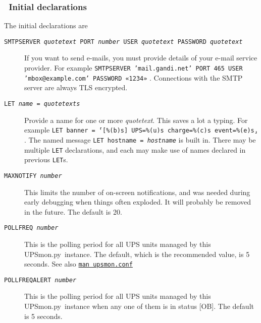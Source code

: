 \documentclass[12pt]{article}
\newlength{\headersep}\setlength{\headersep}{3mm}
\newcommand{\Hsep}{\hspace{\headersep}}
\newcommand{\UPSmon}{\mbox{\textcolor{UPSMONCOLOUR}{UPSmon.py}}}
\newcommand{\status}[1]{\textcolor{UPSDCOLOUR}{[{#1}]}}
\newcommand{\NUTman}[1]{\href{https://networkupstools.org/docs/man/#1.html}{\texttt{man #1}}}
\begin{document}
\subsubsection{\Hsep\ Initial declarations}\label{section:initdecl}

The initial declarations are 

\begin{description}

\item[\texttt{SMTPSERVER \textit{quotetext} PORT \textit{number} USER
    \textit{quotetext} PASSWORD \textit{quotetext}}] \hspace{7mm} If you want
  to send e-mails, you must provide details of your e-mail service provider.
  For example \texttt{SMTPSERVER 'mail.gandi.net' PORT 465 USER
    'mbox@example.com' PASSWORD «1234»} . Connections with the SMTP server
  are always TLS encrypted.

\item[\texttt{LET \textit{name} = \textit{quotetexts}}] \hspace{7mm} Provide a
  name for one or more \textit{quotetext}.  This saves a lot a typing.  For
  example \texttt{LET banner = ⸢[\%(b)s] UPS=\%(u)s charge=\%(c)s
    event=\%(e)s⸥} .  The named message \texttt{LET hostname =
    \textit{hostname}} is built in.  There may be multiple \texttt{LET}
  declarations, and each may make use of names declared in previous
  \texttt{LET}s.

\item[\texttt{MAXNOTIFY \textit{number}}] \hspace{7mm} This limits the number
  of on-screen notifications, and was needed during early debugging when
  things often exploded.  It will probably be removed in the future.  The
  default is 20.

\item[\texttt{POLLFREQ \textit{number}}] \hspace{7mm} This is the polling
  period for all UPS units managed by this \UPSmon\ instance.  The default,
  which is the recommended value, is 5 seconds.  See also \NUTman{upsmon.conf}

\item[\texttt{POLLFREQALERT \textit{number}}] \hspace{3mm} This is the polling
  period for all UPS units managed by this \UPSmon\ instance when any one of
  them is in status \status{OB}.  The default is 5 seconds.

\end{description}
\end{document}
